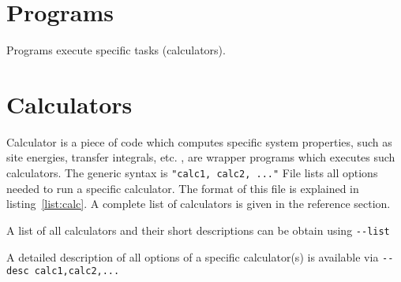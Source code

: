 \label{sec:reference}
\chapter{Programs}
\label{ref:programs}
\label{sec:programs}
Programs execute specific tasks (calculators). 



\chapter{Calculators}
\label{ref:calculators}
\label{sec:calculators}

Calculator is a piece of code which computes specific system properties, such as site energies, transfer integrals, etc. \ctprun, \kmcrun are wrapper programs which executes such calculators. The generic syntax is 
\vskip 0.2cm
{\noindent \small \ctprun \exe \texttt{"calc1, calc2, ..."} \opt \xmloptions }
\vskip 0.2cm
%
File \xmloptions lists all options needed to run a specific calculator. The format of this file is explained in listing~\ref{list:calc}. A complete list of calculators is given in the  reference section.
%


A list of all calculators and their short descriptions can be obtain using 
\vskip 0.1cm
{\noindent \small \ctprun \texttt{-{}-list} }
\vskip 0.1cm

A detailed description of all options of a specific calculator(s) is available via
\vskip 0.1cm
{\noindent \small \ctprun \texttt{-{}-desc calc1,calc2,...} }


\vfill

%
\vfill
